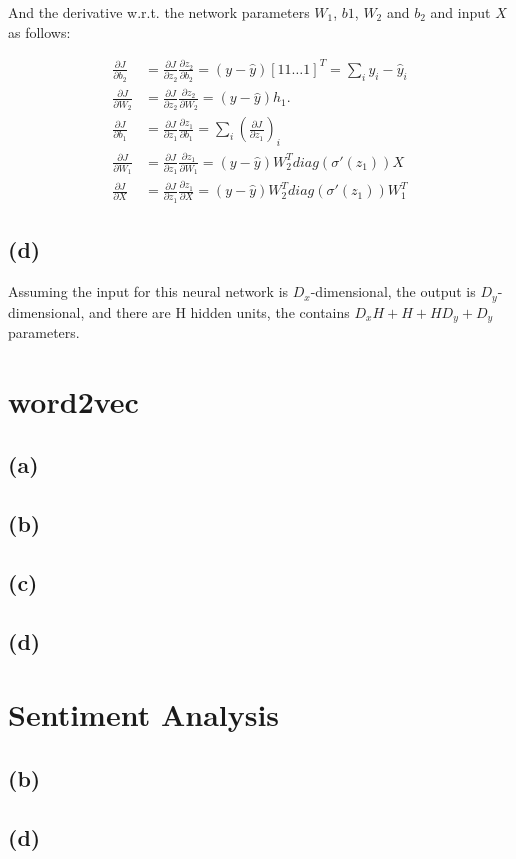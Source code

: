 \documentclass[11pt]{article}
\begin{document}
And the derivative w.r.t. the network parameters $W_{1}$, $b{1}$, $W_{2}$ and $b_{2}$ and input $X$ as follows:

\begin{equation*}
  \label{eq:param-grads}
  \begin{split}
    \frac{\partial J}{\partial b_{2}} &= \frac{\partial J}{\partial z_{2}}\frac{\partial z_{2}}{\partial b_{2}} = (y - \hat{y}) [1 1 \hdots 1]^{T} = \sum_{i}{y_{i} - \hat{y}_{i}}
    \\
    \frac{\partial J}{\partial W_{2}} &= \frac{\partial J}{\partial z_{2}}\frac{\partial z_{2}}{\partial W_{2}} = (y - \hat{y}) h_{1}.
    \\
    \frac{\partial J}{\partial b_{1}} &= \frac{\partial J}{\partial z_{1}}\frac{\partial z_{1}}{\partial b_{1}} = \sum_{i}{(\frac{\partial J}{\partial z_{1}})_{i}}
    \\
    \frac{\partial J}{\partial W_{1}} &= \frac{\partial J}{\partial z_{1}}\frac{\partial z_{1}}{\partial W_{1}} = (y - \hat{y}) W_{2}^{T} diag(\sigma'(z_{1})) X
    \\
    \frac{\partial J}{\partial X} &= \frac{\partial J}{\partial z_{1}}\frac{\partial z_{1}}{\partial X} = (y - \hat{y}) W_{2}^{T} diag(\sigma'(z_{1})) W_{1}^{T}
  \end{split}
\end{equation*}

\subsection*{(d)}
Assuming the input for this neural network is $D_{x}$-dimensional, the output is $D_{y}$-dimensional, and there are H hidden units, the contains $D_{x}H + H + HD_{y} + D_{y}$ parameters.

\section{word2vec}
\subsection*{(a)}
\subsection*{(b)}
\subsection*{(c)}
\subsection*{(d)}

\section{Sentiment Analysis}
\subsection*{(b)}

\subsection*{(d)}
\end{document}
